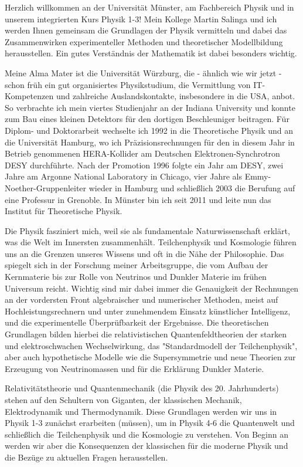 \begin{multicols}{2}
Herzlich willkommen an der Universität Münster, am Fachbereich Physik und in unserem integrierten Kurs Physik 1-3! Mein Kollege Martin Salinga und ich werden Ihnen gemeinsam die Grundlagen der Physik vermitteln und dabei das Zusammenwirken experimenteller Methoden und theoretischer Modellbildung herausstellen. Ein gutes Verständnis der Mathematik ist dabei besonders wichtig.

Meine Alma Mater ist die Universität Würzburg, die - ähnlich wie wir jetzt - schon früh ein gut organisiertes Physikstudium, die Vermittlung von IT-Kompetenzen und zahlreiche Auslandskontakte, insbesondere in die USA, anbot. So verbrachte ich mein viertes Studienjahr an der Indiana University und konnte zum Bau eines kleinen Detektors für den dortigen Beschleuniger beitragen. Für Diplom- und Doktorarbeit wechselte ich 1992 in die Theoretische Physik und an die Universität Hamburg, wo ich Präzisionsrechnungen für den in diesem Jahr in Betrieb genommenen HERA-Kollider am Deutschen Elektronen-Synchrotron DESY durchführte. Nach der Promotion 1996 folgte ein Jahr am DESY, zwei Jahre am Argonne National Laboratory in Chicago, vier Jahre als Emmy-Noether-Gruppenleiter wieder in Hamburg und schließlich 2003 die Berufung auf eine Professur in Grenoble. In Münster bin ich seit 2011 und leite nun das Institut für Theoretische Physik.

Die Physik fasziniert mich, weil sie als fundamentale Naturwissenschaft erklärt, was die Welt im Innersten zusammenhält. Teilchenphysik und Kosmologie führen uns an die Grenzen unseres Wissens und oft in die Nähe der Philosophie. Das spiegelt sich in der Forschung meiner Arbeitsgruppe, die vom Aufbau der Kernmaterie bis zur Rolle von Neutrinos und Dunkler Materie im frühen Universum reicht. Wichtig sind mir dabei immer die Genauigkeit der Rechnungen an der vordersten Front algebraischer und numerischer Methoden, meist auf Hochleistungsrechnern und unter zunehmendem Einsatz künstlicher Intelligenz, und die experimentelle Überprüfbarkeit der Ergebnisse. Die theoretischen Grundlagen bilden hierbei die relativistischen Quantenfeldtheorien der starken und elektroschwachen Wechselwirkung, das "Standardmodell der Teilchenphysik", aber auch hypothetische Modelle wie die Supersymmetrie und neue Theorien zur Erzeugung von Neutrinomassen und für die Erklärung Dunkler Materie.

Relativitätstheorie und Quantenmechanik (die Physik des 20. Jahrhunderts) stehen auf den Schultern von Giganten, der klassischen Mechanik, Elektrodynamik und Thermodynamik. Diese Grundlagen werden wir uns in Physik 1-3 zunächst erarbeiten (müssen), um in Physik 4-6 die Quantenwelt und schließlich die Teilchenphysik und die Kosmologie zu verstehen. Von Beginn an werden wir aber die Konsequenzen der klassischen für die moderne Physik und die Bezüge zu aktuellen Fragen herausstellen.


\end{multicols}
